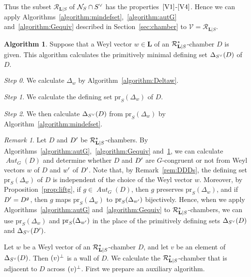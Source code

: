 \documentclass{amsart}
\theoremstyle{plain}
\theoremstyle{definition}
\newtheorem{algorithm}[theorem]{Algorithm}
\theoremstyle{remark}
\newtheorem{remark}[theorem]{Remark}
\numberwithin{equation}{section}
\numberwithin{table}{section}
\numberwithin{figure}{section}
\newcommand{\step}[1]{{\it Step #1}}
\newcommand{\NNN}{\mathord{\mathcal N}}
\newcommand{\RRR}{\mathord{\mathcal R}}
\newcommand{\VVV}{\mathord{\mathcal V}}
\newcommand{\sprime}{\sp\prime}
\newcommand{\sperp}{\sp{\perp}}
\newcommand{\dual}{\sp{\vee}}
\newcommand{\pr}{\mathord{\mathrm {pr}}}
\renewcommand{\L}{\mathord{\mathbf{L}}}
\newcommand{\aut}{\operatorname{\mathit {Aut}}\nolimits}
\newcommand{\Roots}{\RRR}
\newcommand{\sphyp}{\sp*}
\newcommand{\RtsLS}{\Roots_{\L|S}}
\newcommand{\propVone}{\mathord{\rm [V1]}}
\newcommand{\propVfour}{\mathord{\rm [V4]}}
\begin{document}
%
Thus 
the subset $\RtsLS$ of $\NNN_S\cap S\dual$  has 
the properties~$\propVone$-$\propVfour$.
Hence we can apply Algorithms~\ref{algorithm:mindefset},~\ref{algorithm:autG}
and~\ref{algorithm:Gequiv} described in Section~\ref{sec:chamber}
to  $\VVV=\RtsLS$. 
%
\begin{algorithm}\label{algorithm:aSnS}
Suppose that a Weyl vector $w\in \L$ of 
an $\RtsLS\sphyp$-chamber $D$ is given.
This algorithm calculates 
the primitively minimal defining set $\Delta_{S\dual}(D)$ of $D$.
\par
\step{0}.
We calculate $\Delta_w$ by Algorithm~\ref{algorithm:Deltaw}.
\par
\step{1}.
We calculate the defining set $\pr_S(\Delta_{w})$ of $D$.
\par
\step{2}.
We then calculate  $\Delta_{S\dual}(D)$ from $\pr_S(\Delta_{w})$ by Algorithm~\ref{algorithm:mindefset}.
\end{algorithm}
%
%
\begin{remark}\label{rem:prSDelta}
Let $D$ and $D\sprime$ be $\RtsLS\sphyp$-chambers.
By Algorithms~\ref{algorithm:autG},~\ref{algorithm:Gequiv} and~\ref{algorithm:aSnS},
we can calculate $\aut_G(D)$ and determine whether $D$ and $D\sprime$ are $G$-congruent or not 
from Weyl vectors $w$ of $D$ and $w\sprime$ of $D\sprime$.
Note that, by Remark~\ref{rem:DDDs},
the defining set $\pr_S(\Delta_w)$ of $D$ is independent of the choice of the Weyl vector $w$.
Moreover, by Proposition~\ref{prop:liftg},
if $g\in \aut_G(D)$, then $g$ preserves $\pr_S(\Delta_w)$,
and if $D\sprime=D^g$, then
$g$ maps $\pr_S(\Delta_w)$ to $\pr_S(\Delta_{w\sprime})$ bijectively.
Hence, when we apply Algorithms~\ref{algorithm:autG} and~\ref{algorithm:Gequiv}
to $\RtsLS\sphyp$-chambers, 
we can use $\pr_S(\Delta_w)$ and $\pr_S(\Delta_{w\sprime})$
in the place of the primitively defining sets $\Delta_{S\dual}(D)$ and $\Delta_{S\dual}(D\sprime)$.
\end{remark}
%
%
Let $w$ be a  Weyl vector of 
an $\RtsLS\sphyp$-chamber $D$,
and let 
$v$ be an element of  $\Delta_{S\dual}(D)$.
Then $(v)\sperp$ is a wall of $D$.
We calculate the $\RtsLS\sphyp$-chamber that is adjacent to $D$ across $(v)\sperp$.
First we prepare an auxiliary algorithm.
%
\end{document}
